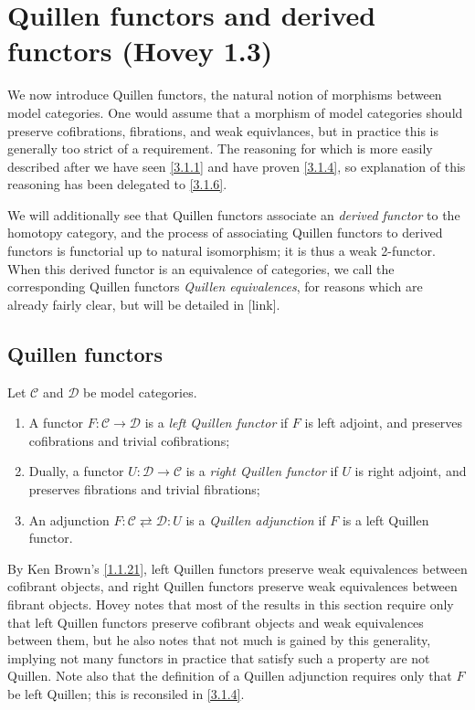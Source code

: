\chapter{Quillen functors and derived functors (Hovey 1.3)}

We now introduce Quillen functors, the natural notion of morphisms between model categories. One would assume that a morphism of model categories should preserve cofibrations, fibrations, and weak equivlances, but in practice this is generally too strict of a requirement. The reasoning for which is more easily described after we have seen \cref{3.1.1} and have proven \cref{3.1.4}, so explanation of this reasoning has been delegated to \cref{3.1.6}.

We will additionally see that Quillen functors associate an \emph{derived functor} to the homotopy category, and the process of associating Quillen functors to derived functors is functorial up to natural isomorphism; it is thus a weak 2-functor. When this derived functor is an equivalence of categories, we call the corresponding Quillen functors \emph{Quillen equivalences}, for reasons which are already fairly clear, but will be detailed in [link].

\section{Quillen functors}

\begin{definition}\label{3.1.1}
	Let $\mathcal{C} $ and $\mathcal{D} $ be model categories.
	\begin{enumerate}
		\item A functor $F : \mathcal{C}  \to \mathcal{D} $ is a \emph{left Quillen functor} if $F$ is left adjoint, and preserves cofibrations and trivial cofibrations;
		\item Dually, a functor $U : \mathcal{D}  \to \mathcal{C} $ is a \emph{right Quillen functor} if $U$ is right adjoint, and preserves fibrations and trivial fibrations;
		\item An adjunction $F : \mathcal{C} \rightleftarrows \mathcal{D}  : U$ is a \emph{Quillen adjunction} if $F$ is a left Quillen functor.
	\end{enumerate}
\end{definition}
\begin{remark}\label{3.1.2}
	By Ken Brown's \cref{1.1.21}, left Quillen functors preserve weak equivalences between cofibrant objects, and right Quillen functors preserve weak equivalences between fibrant objects. Hovey notes that most of the results in this section require only that left Quillen functors preserve cofibrant objects and weak equivalences between them, but he also notes that not much is gained by this generality, implying not many functors in practice that satisfy such a property are not Quillen. Note also that the definition of a Quillen adjunction requires only that $F$ be left Quillen; this is reconsiled in \cref{3.1.4}.
\end{remark}

